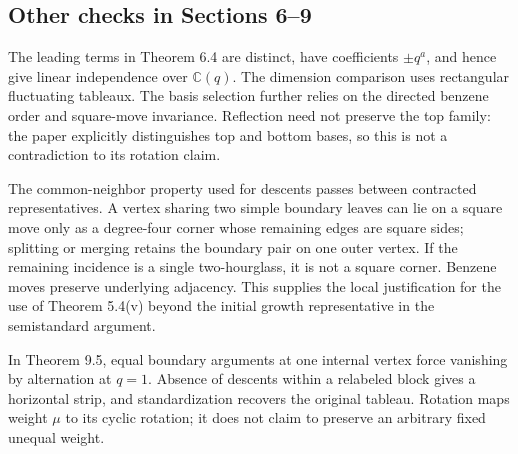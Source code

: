 \documentclass[10pt]{article}
\begin{document}
\subsection*{Other checks in Sections 6–9}
The leading terms in Theorem 6.4 are distinct, have coefficients \(\pm q^a\), and hence give linear independence over \(\mathbb C(q)\). The dimension comparison uses rectangular fluctuating tableaux. The basis selection further relies on the directed benzene order and square-move invariance. Reflection need not preserve the top family: the paper explicitly distinguishes top and bottom bases, so this is not a contradiction to its rotation claim.\par
The common-neighbor property used for descents passes between contracted representatives. A vertex sharing two simple boundary leaves can lie on a square move only as a degree-four corner whose remaining edges are square sides; splitting or merging retains the boundary pair on one outer vertex. If the remaining incidence is a single two-hourglass, it is not a square corner. Benzene moves preserve underlying adjacency. This supplies the local justification for the use of Theorem 5.4(v) beyond the initial growth representative in the semistandard argument.\par
In Theorem 9.5, equal boundary arguments at one internal vertex force vanishing by alternation at \(q=1\). Absence of descents within a relabeled block gives a horizontal strip, and standardization recovers the original tableau. Rotation maps weight \(\mu\) to its cyclic rotation; it does not claim to preserve an arbitrary fixed unequal weight.\par
\end{document}

